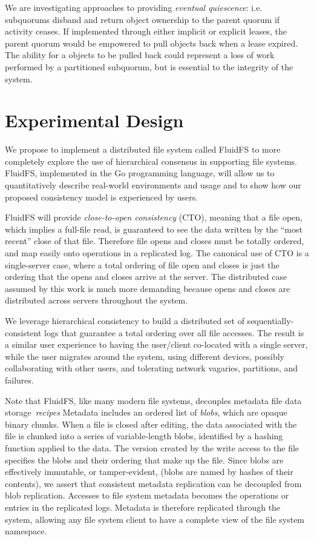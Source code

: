\documentclass[11pt,letterpaper]{article}
\begin{document}
We are investigating approaches to providing \emph{eventual quiescence}: i.e.
subquorums disband and return object ownership to the parent quorum if activity ceases.
If implemented through either implicit or explicit leases,
the parent quorum would be empowered to pull objects back when a lease expired.
The ability for a objects to be pulled back could represent a loss of work performed by a
partitioned subquorum, but is essential to the integrity of the system.

\section{Experimental Design}

We propose to implement a distributed file system called FluidFS to more completely explore
the use of hierarchical consensus in supporting file systems.
FluidFS, implemented in the Go programming language, will allow us to quantitatively
describe real-world environments and usage and to show how our proposed consistency
model is experienced by users.

FluidFS will provide \emph{close-to-open consistency} (CTO), meaning that a file
open, which implies a full-file read, is guaranteed to see the data written by the ``most recent'' close of
that file.
Therefore file opens and closes must be totally ordered, and map
easily onto operations in a replicated log.
The canonical use of CTO is a single-server case, where a total
ordering of file open and closes is just the ordering that the opens
and closes arrive at the server.
The distributed case assumed by this work is much more demanding because
opens and closes are distributed across servers throughout the system.

We leverage hierarchical consistency to build a distributed set of sequentially-consistent logs
that guarantee a total ordering over all file accesses.
The result is a similar user experience to having the user/client co-located with a single
server, while the user migrates around the system, using different devices, possibly
collaborating with other users, and tolerating network vagaries, partitions, and failures.

Note that FluidFS, like many modern file systems,
decouples metadata file
data storage~\emph{recipes}
Metadata includes an ordered list of \emph{blobs}, which are opaque binary chunks.
When a file is closed after editing, the data associated with the file is chunked into a
series of variable-length blobs, identified by a hashing function applied to
the data.
The version created by the write access to the file specifies the blobs and their ordering
that make up the file.
Since blobs are effectively immutable, or tamper-evident, (blobs are named by hashes of
their contents), we assert that consistent metadata replication can be decoupled from blob
replication.
Accesses to file system metadata becomes the operations or entries in the replicated logs.
Metadata is therefore replicated through the system, allowing any file
system client to have a complete view of the file system namespace.
\end{document}
